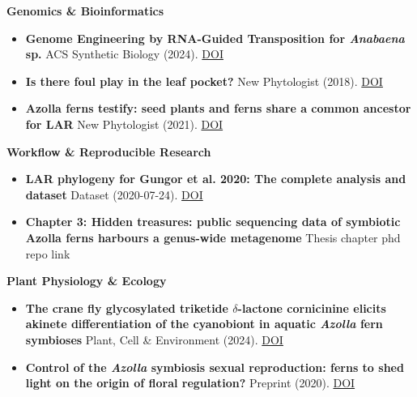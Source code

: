 \documentclass[a4paper,10pt]{article}
\begin{document}
\noindent\textbf{Genomics \& Bioinformatics}
  \begin{itemize}
    \item \textbf{Genome Engineering by RNA-Guided Transposition for \textit{Anabaena} sp.}  
      ACS Synthetic Biology (2024). \href{https://doi.org/10.1021/acssynbio.3c00583}{DOI}
    \item \textbf{Is there foul play in the leaf pocket?}  
      New Phytologist (2018). \href{https://doi.org/10.1111/nph.14843}{DOI}
      \item \textbf{Azolla ferns testify: seed plants and ferns share a common ancestor for LAR}  
        New Phytologist (2021). \href{https://doi.org/10.1111/nph.16896}{DOI}
  \end{itemize}

\noindent\textbf{Workflow \& Reproducible Research}
  \begin{itemize}
    \item \textbf{LAR phylogeny for Gungor et al. 2020: The complete analysis and dataset}  
      Dataset (2020-07-24). \href{https://doi.org/10.5281/zenodo.3959057}{DOI}
    \item \textbf{Chapter 3: Hidden treasures: public sequencing data of symbiotic Azolla ferns harbours a genus-wide metagenome}
      Thesis chapter phd repo link
  \end{itemize}

\noindent\textbf{Plant Physiology \& Ecology}
  \begin{itemize}
    \item \textbf{The crane fly glycosylated triketide $\delta$-lactone cornicinine elicits akinete differentiation of the cyanobiont in aquatic \textit{Azolla} fern symbioses}  
      Plant, Cell \& Environment (2024). \href{https://doi.org/10.1111/pce.14907}{DOI}
    \item \textbf{Control of the \textit{Azolla} symbiosis sexual reproduction: ferns to shed light on the origin of floral regulation?}  
      Preprint (2020). \href{https://doi.org/10.3389/fpls.2021.693039}{DOI}
  \end{itemize}
\end{document}
